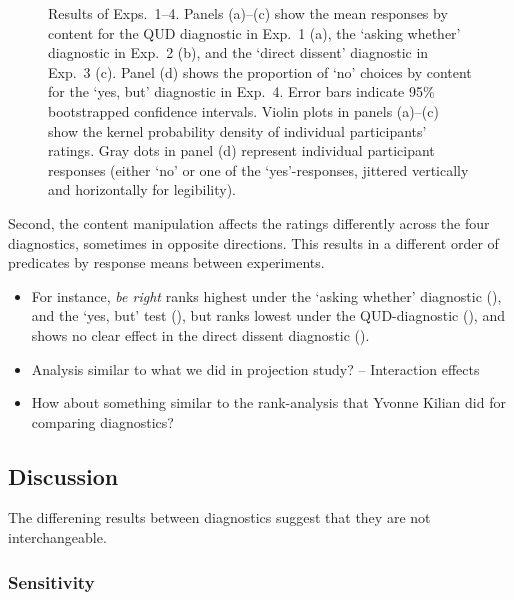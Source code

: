 \documentclass[times,linguex]{glossa}
\begin{document}
\begin{figure}[h!]
    \caption{Results of Exps.~1--4. Panels (a)--(c) show the mean responses by content for the QUD diagnostic in Exp.~1 (a), the `asking whether' diagnostic in Exp.~2 (b), and the `direct dissent' diagnostic in Exp.~3 (c). Panel (d) shows the proportion of `no' choices by content for the `yes, but' diagnostic in Exp.~4. Error bars indicate 95\% bootstrapped confidence intervals. Violin plots in panels (a)--(c) show the kernel probability density of individual participants’ ratings. Gray dots in panel (d) represent individual participant responses (either ‘no’ or one of the ‘yes’-responses, jittered vertically and horizontally for legibility).}
    \label{fig:results}
  \end{figure}

   Second, the content manipulation affects the ratings differently across the four diagnostics, sometimes in opposite directions. This results in a different order of predicates by response means between experiments.
    \begin{itemize}
      \item For instance, \emph{be right} ranks highest under the `asking whether' diagnostic (), and the `yes, but' test (), but ranks lowest under the QUD-diagnostic (), and shows no clear effect in the direct dissent diagnostic ().
    \end{itemize}
    
    \begin{itemize}
      \item Analysis similar to what we did in projection study? -- Interaction effects
      \item How about something similar to the rank-analysis that Yvonne Kilian did for comparing diagnostics?

    \end{itemize}

  \subsection{Discussion}
    The differening results between diagnostics suggest that they are not interchangeable.

    \subsubsection{Sensitivity}
\end{document}
